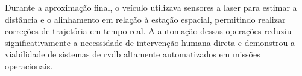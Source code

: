 Durante a aproximação final, o veículo utilizava sensores a laser para estimar a distância e o alinhamento em relação à estação espacial, permitindo realizar correções de trajetória em tempo real. 
A automação dessas operações reduziu significativamente a necessidade de intervenção humana direta e demonstrou a viabilidade de sistemas de \gls{rvdb} altamente automatizados em missões operacionais.